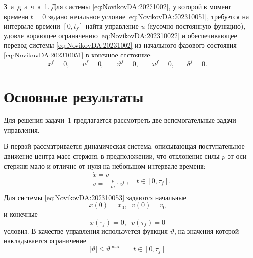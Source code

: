 З~а~д~а~ч~а~1. Для системы \eqref{eq:NovikovDA:20231002}, у которой в момент времени $t=0$ задано начальное условие \eqref{eq:NovikovDA:202310051}, требуется на интервале времени $[0,t_f]$ найти управление $u$ (кусочно-постоянную функцию), удовлетворяющее ограничению \eqref{eq:NovikovDA:202310022} и обеспечивающее перевод системы \eqref{eq:NovikovDA:20231002} из начального фазового состояния \eqref{eq:NovikovDA:202310051} в конечное состояние:
\begin{equation}\label{eq:NovikovDA:202310052}
	x^f=0\text{,} \qquad  {v}^f = 0\text{,} \qquad  \vartheta^f=0\text{,} \qquad  \omega^f=0\text{,} \qquad  \delta^f=0\text{.}
\end{equation}


\section{Основные результаты} %

Для решения задачи~1 предлагается рассмотреть две вспомогательные задачи управления.

В первой рассматривается динамическая система, описывающая поступательное движение центра масс стержня, в предположении, что отклонение силы $p$ от оси стержня мало и отлично от нуля на небольшом интервале времени:
\begin{equation}\label{eq:NovikovDA:202310053}
	\begin{aligned}
		&\dot x=v \\
		&\dot{v}=-\frac{p}{m}\cdot \vartheta \\
	\end{aligned},
	\quad t \in [0,\tau_f].
\end{equation}
Для системы \eqref{eq:NovikovDA:202310053} задаются начальные
\begin{equation}\label{eq:NovikovDA:202310054}
x(0)=x_0,~~~v(0)= v_0
\end{equation}
и конечные 
\begin{equation}\label{eq:NovikovDA:202310055}
x(\tau_f)=0,~~~v(\tau_f)= 0
\end{equation}
условия. В качестве управления используется функция $\vartheta$, на значения которой накладывается ограничение 
\begin{equation}\label{eq:NovikovDA:202310056}
|\vartheta|\leq \vartheta^{\max}\qquad t\in[0,\tau_f]
\end{equation}

